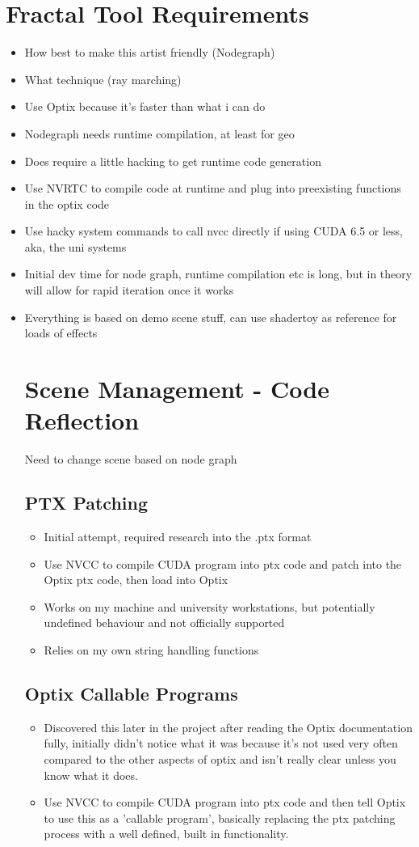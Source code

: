 \documentclass[11pt,a4paper,final,notitlepage]{report}
\begin{document}
\section{Fractal Tool Requirements}

\begin{itemize}
	\item How best to make this artist friendly (Nodegraph)
	\item What technique (ray marching)
	\item Use Optix because it's faster than what i can do
	\item Nodegraph needs runtime compilation, at least for geo
	\item Does require a little hacking to get runtime code generation
	\item Use NVRTC to compile code at runtime and plug into preexisting functions in the optix code
	\item Use hacky system commands to call nvcc directly if using CUDA 6.5 or less, aka, the uni systems
	\item Initial dev time for node graph, runtime compilation etc is long, but in theory will allow for rapid iteration once it works
	\item Everything is based on demo scene stuff, can use shadertoy as reference for loads of effects
	\section{Scene Management - Code Reflection}
		Need to change scene based on node graph
	\subsection{PTX Patching}
		\begin{itemize}
			\item Initial attempt, required research into the .ptx format
			\item Use NVCC to compile CUDA program into ptx code and patch into the Optix ptx code, then load into Optix
			\item Works on my machine and university workstations, but potentially undefined behaviour and not officially supported
			\item Relies on my own string handling functions
		\end{itemize}
	\subsection{Optix Callable Programs}
		\begin{itemize}
			\item Discovered this later in the project after reading the Optix documentation fully, initially didn't notice what it was because it's not used very often compared to the other aspects of optix and isn't really clear unless you know what it does.
			\item Use NVCC to compile CUDA program into ptx code and then tell Optix to use this as a 'callable program', basically replacing the ptx patching process with a well defined, built in functionality.
			

\end{itemize}
\end{itemize}
\end{document}
